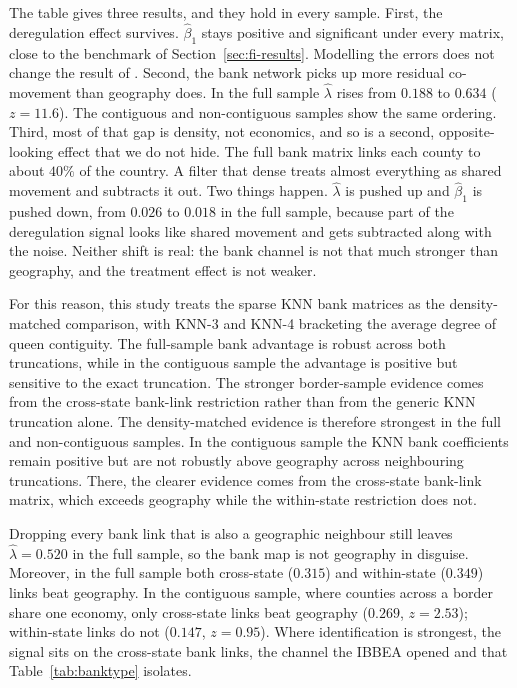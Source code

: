 The table gives three results, and they hold in every sample. 
First, the deregulation effect survives. $\hat\beta_1$ stays positive and significant under every matrix, close to the benchmark of
Section~\ref{sec:fi-results}. Modelling the errors does not change the result of \cite{favara2015}. 
Second, the bank network picks up more residual co-movement than geography does. In the full sample $\hat\lambda$ rises from $0.188$ to $0.634$ ($z=11.6$). The contiguous and non-contiguous samples show the same ordering.
Third, most of that gap is density, not economics, and so is a second,
opposite-looking effect that we do not hide. The full bank matrix links each county to about $40\%$ of the country. A filter that dense treats almost everything as shared movement and subtracts it out. Two things happen. $\hat\lambda$ is pushed up and $\hat\beta_1$ is pushed down, from $0.026$ to
$0.018$ in the full sample, because part of the deregulation signal looks like shared movement and
gets subtracted along with the noise. Neither shift is real: the bank channel is not that much stronger than geography, and the treatment effect is not weaker.

For this reason, this study treats the sparse KNN bank matrices as the density-matched comparison,
with KNN-3 and KNN-4 bracketing the average degree of queen contiguity. The full-sample
bank advantage is robust across both truncations, while in the contiguous sample the
advantage is positive but sensitive to the exact truncation. The stronger border-sample
evidence comes from the cross-state bank-link restriction rather than from the generic
KNN truncation alone. The density-matched evidence is therefore strongest in the full and non-contiguous
samples. In the contiguous sample the KNN bank coefficients remain positive but are
not robustly above geography across neighbouring truncations. There, the clearer
evidence comes from the cross-state bank-link matrix, which exceeds geography while
the within-state restriction does not.

Dropping every bank link that is also a geographic neighbour still leaves
$\hat\lambda=0.520$ in the full sample, so the bank map is not geography in
disguise. Moreover, in the full sample both
cross-state ($0.315$) and within-state ($0.349$) links beat geography. In the
contiguous sample, where counties across a border share one
economy, only cross-state links beat geography ($0.269$, $z=2.53$); within-state
links do not ($0.147$, $z=0.95$). Where identification is strongest, the signal sits on the cross-state bank links, the channel the IBBEA opened and that
Table~\ref{tab:banktype} isolates.

